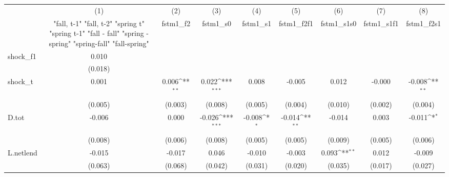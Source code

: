 {
\def\sym#1{\ifmmode^{#1}\else\(^{#1}\)\fi}
\begin{tabular}{l*{8}{c}}
\toprule
            &\multicolumn{1}{c}{(1)}&\multicolumn{1}{c}{(2)}&\multicolumn{1}{c}{(3)}&\multicolumn{1}{c}{(4)}&\multicolumn{1}{c}{(5)}&\multicolumn{1}{c}{(6)}&\multicolumn{1}{c}{(7)}&\multicolumn{1}{c}{(8)}\\
            &\multicolumn{1}{c}{  "fall, t-1" "fall, t-2" "spring t" "spring t-1"  "fall - fall" "spring - spring" "spring-fall" "fall-spring" }&\multicolumn{1}{c}{fstm1\_f2}&\multicolumn{1}{c}{fstm1\_s0}&\multicolumn{1}{c}{fstm1\_s1}&\multicolumn{1}{c}{fstm1\_f2f1}&\multicolumn{1}{c}{fstm1\_s1s0}&\multicolumn{1}{c}{fstm1\_s1f1}&\multicolumn{1}{c}{fstm1\_f2s1}\\
\midrule
shock\_f1    &       0.010         &                     &                     &                     &                     &                     &                     &                     \\
            &     (0.018)         &                     &                     &                     &                     &                     &                     &                     \\
\addlinespace
shock\_t     &       0.001         &       0.006\sym{**} &       0.022\sym{***}&       0.008         &      -0.005         &       0.012         &      -0.000         &      -0.008\sym{**} \\
            &     (0.005)         &     (0.003)         &     (0.008)         &     (0.005)         &     (0.004)         &     (0.010)         &     (0.002)         &     (0.004)         \\
\addlinespace
D.tot       &      -0.006         &       0.000         &      -0.026\sym{***}&      -0.008\sym{*}  &      -0.014\sym{**} &      -0.014         &       0.003         &      -0.011\sym{*}  \\
            &     (0.008)         &     (0.006)         &     (0.008)         &     (0.005)         &     (0.005)         &     (0.009)         &     (0.005)         &     (0.006)         \\
\addlinespace
L.netlend   &      -0.015         &      -0.017         &       0.046         &      -0.010         &      -0.003         &       0.093\sym{**} &       0.012         &      -0.009         \\
            &     (0.063)         &     (0.068)         &     (0.042)         &     (0.031)         &     (0.020)         &     (0.035)         &     (0.017)         &     (0.027)         \\

\end{tabular}}
